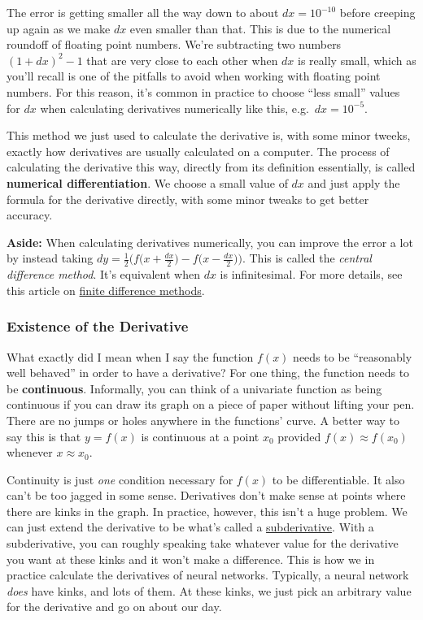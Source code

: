 \documentclass[
  letterpaper,
  DIV=11,
  numbers=noendperiod]{scrreprt}
\begin{document}
The error is getting smaller all the way down to about \(dx=10^{-10}\)
before creeping up again as we make \(dx\) even smaller than that. This
is due to the numerical roundoff of floating point numbers. We're
subtracting two numbers \((1+dx)^2 - 1\) that are very close to each
other when \(dx\) is really small, which as you'll recall is one of the
pitfalls to avoid when working with floating point numbers. For this
reason, it's common in practice to choose ``less small'' values for
\(dx\) when calculating derivatives numerically like this,
e.g.~\(dx=10^{-5}\).

This method we just used to calculate the derivative is, with some minor
tweeks, exactly how derivatives are usually calculated on a computer.
The process of calculating the derivative this way, directly from its
definition essentially, is called \textbf{numerical differentiation}. We
choose a small value of \(dx\) and just apply the formula for the
derivative directly, with some minor tweaks to get better accuracy.

\textbf{Aside:} When calculating derivatives numerically, you can
improve the error a lot by instead taking
\(dy=\frac{1}{2}\big(f\big(x+\frac{dx}{2}\big)-f\big(x-\frac{dx}{2}\big)\big)\).
This is called the \emph{central difference method}. It's equivalent
when \(dx\) is infinitesimal. For more details, see this article on
\href{https://en.wikipedia.org/wiki/Finite_difference}{finite difference
methods}.

\hypertarget{existence-of-the-derivative}{%
\subsubsection{Existence of the
Derivative}\label{existence-of-the-derivative}}

What exactly did I mean when I say the function \(f(x)\) needs to be
``reasonably well behaved'' in order to have a derivative? For one
thing, the function needs to be \textbf{continuous}. Informally, you can
think of a univariate function as being continuous if you can draw its
graph on a piece of paper without lifting your pen. There are no jumps
or holes anywhere in the functions' curve. A better way to say this is
that \(y=f(x)\) is continuous at a point \(x_0\) provided
\(f(x) \approx f(x_0)\) whenever \(x \approx x_0\).

Continuity is just \emph{one} condition necessary for \(f(x)\) to be
differentiable. It also can't be too jagged in some sense. Derivatives
don't make sense at points where there are kinks in the graph. In
practice, however, this isn't a huge problem. We can just extend the
derivative to be what's called a
\href{https://en.wikipedia.org/wiki/Subderivative}{subderivative}. With
a subderivative, you can roughly speaking take whatever value for the
derivative you want at these kinks and it won't make a difference. This
is how we in practice calculate the derivatives of neural networks.
Typically, a neural network \emph{does} have kinks, and lots of them. At
these kinks, we just pick an arbitrary value for the derivative and go
on about our day.
\end{document}
